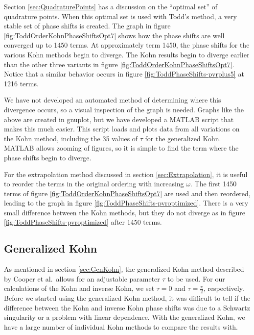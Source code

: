 \documentclass[Dissertation.tex]{subfiles}
\begin{document}
Section \ref{sec:QuadraturePoints} has a discussion on the ``optimal set'' of quadrature points. When this optimal set is used with Todd's method, a very stable set of phase shifts is created. The graph in figure \ref{fig:ToddOrderKohnPhaseShiftsOpt7} shows how the phase shifts are well converged up to 1450 terms. At approximately term 1450, the phase shifts for the various Kohn methods begin to diverge. The Kohn results begin to diverge earlier than the other three variants in figure \ref{fig:ToddOrderKohnPhaseShiftsOpt7}. Notice that a similar behavior occurs in figure \ref{fig:ToddPhaseShifts-pvrplus5} at 1216 terms.

We have not developed an automated method of determining where this divergence occurs, so a visual inspection of the graph is needed. Graphs like the above are created in gnuplot, but we have developed a MATLAB script that makes this much easier. This script loads and plots data from all variations on the Kohn method, including the 35 values of $\tau$ for the generalized Kohn. MATLAB allows zooming of figures, so it is simple to find the term where the phase shifts begin to diverge.

For the extrapolation method discussed in section \ref{sec:Extrapolation}, it is useful to reorder the terms in the original ordering with increasing $\omega$. The first 1450 terms of figure \ref{fig:ToddOrderKohnPhaseShiftsOpt7} are used and then reordered, leading to the graph in figure \ref{fig:ToddPhaseShifts-pvroptimized}. There is a very small difference between the Kohn methods, but they do not diverge as in figure \ref{fig:ToddPhaseShifts-pvroptimized} after 1450 terms.




\subsection{Generalized Kohn}
\label{sec:CompGenKohn}
As mentioned in section \ref{sec:GenKohn}, the generalized Kohn method described by Cooper et al.\ allows for an adjustable parameter $\tau$ to be used. For our calculations of the Kohn and inverse Kohn, we set $\tau = 0$ and $\tau = \frac{\pi}{2}$, respectively. Before we started using the generalized Kohn method, it was difficult to tell if the difference between the Kohn and inverse Kohn phase shifts was due to a Schwartz singularity or a problem with linear dependence. With the generalized Kohn, we have a large number of individual Kohn methods to compare the results with.
\end{document}
